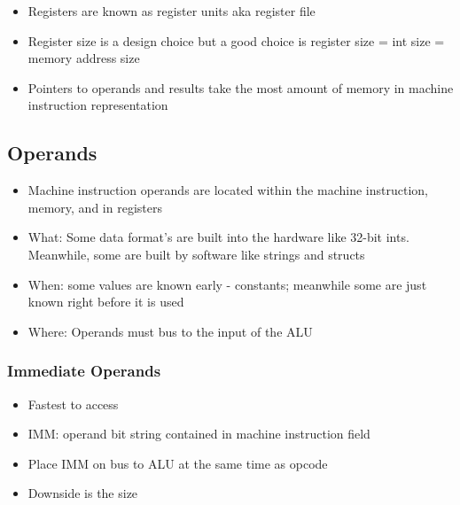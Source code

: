 \documentclass{article}
\begin{document}
 \begin{itemize}
     \item Registers are known as register units aka register file
     
     \item Register size is a design choice but a good choice is register size = int size = memory address size
     
     \item Pointers to operands and results take the most amount of memory in machine instruction representation
 \end{itemize}
 
 \subsection{Operands}
 \begin{itemize}
 
 \item Machine instruction operands are located within the machine instruction, memory, and in registers
 
     \item What: Some data format's are built into the hardware like 32-bit ints. Meanwhile, some are built by software like strings and structs
     
     \item When: some values are known early - constants; meanwhile some are just known right before it is used
     
     \item Where: Operands must bus to the input of the ALU
     
     
 \end{itemize}
 
 \subsubsection{Immediate Operands}
 
 \begin{itemize}
 
 \item Fastest to access
     \item IMM: operand bit string contained in machine instruction field
     
     \item Place IMM on bus to ALU at the same time as opcode
     
     \item Downside is the size
     
     
 \end{itemize}
 
\end{document}

